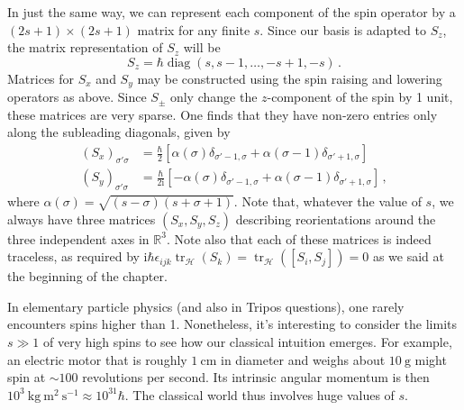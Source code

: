 \documentclass{article}
\theoremstyle{plain}\theoremheaderfont{\normalfont\itshape}\theorembodyfont{\rmfamily}\theoremseparator{.}\newtheorem*{rem}{Remark}\newtheorem*{ex}{Example}\newtheorem*{proof}{Proof}\newtheorem*{altp}{Alternative proof}
\theoremstyle{plain}\theoremheaderfont{\normalfont\bfseries}\theorembodyfont{\rmfamily}\theoremseparator{.}\newtheorem{thm}{Theorem}[section]\newtheorem{lem}[thm]{Lemma}\newtheorem{prop}[thm]{Proposition}\newtheorem*{cor}{Corollary}\newtheorem{defn}[thm]{Definition}\newtheorem{clm}[thm]{Claim}\newtheorem{clminproof}{Claim}
\theoremstyle{break}\theoremheaderfont{\normalfont\itshape}\theorembodyfont{\rmfamily}\theoremseparator{.\medskip}\newtheorem*{proofskip}{Proof}\newtheorem*{exs}{Examples}\newtheorem*{rems}{Remarks}
\theoremstyle{break}\theoremheaderfont{\normalfont\bfseries}\theorembodyfont{\rmfamily}\theoremseparator{.\medskip}\newtheorem{lemskip}[thm]{Lemma}\newtheorem{defnskip}[thm]{Definition}\newtheorem{propskip}[thm]{Proposition}\newtheorem{thmskip}[thm]{Theorem}
\numberwithin{equation}{section}
\newcommand{\unit}[1]{\ \mathrm{#1}}
\newcommand{\ii}{\mathrm{i}}
\newcommand{\hb}{\mathcal{H}}
\DeclareMathOperator{\tr}{tr}
\DeclareMathOperator{\diag}{diag}
\newcommand{\RR}{\mathbb{R}}
\begin{document}
    In just the same way, we can represent each component of the spin operator by a \((2s+1)\times (2s+1)\) matrix for any finite \(s\). Since our basis is adapted to \(S_z\), the matrix representation of \(S_z\) will be
    \begin{equation}
        S_z=\hbar\diag(s,s-1,\dots,-s+1,-s)\,.
    \end{equation}
    Matrices for \(S_x\) and \(S_y\) may be constructed using the spin raising and lowering operators as above. Since \(S_\pm\) only change the \(z\)-component of the spin by 1 unit, these matrices are very sparse. One finds that they have non-zero entries only along the subleading diagonals, given by
    \begin{equation}
        \begin{aligned}
            (S_x)_{\sigma'\sigma}&=\frac{\hbar}{2}[\alpha(\sigma)\delta_{\sigma'-1,\sigma}+\alpha(\sigma-1)\delta_{\sigma'+1,\sigma}]\\
            (S_y)_{\sigma'\sigma}&=\frac{\hbar}{2\ii}[-\alpha(\sigma)\delta_{\sigma'-1,\sigma}+\alpha(\sigma-1)\delta_{\sigma'+1,\sigma}]\,,
        \end{aligned}
    \end{equation}
    where \(\alpha(\sigma)=\sqrt{(s-\sigma)(s+\sigma+1)}\). Note that, whatever the value of \(s\), we always have three matrices \((S_x,S_y,S_z)\) describing reorientations around the three independent axes in \(\RR^3\). Note also that each of these matrices is indeed traceless, as required by \(\ii\hbar\epsilon_{ijk}\tr_\hb(S_k)=\tr_\hb([S_i, S_j])=0\) as we said at the beginning of the chapter.

    In elementary particle physics (and also in Tripos questions), one rarely encounters spins higher than 1. Nonetheless, it's interesting to consider the limits \(s\gg 1\) of very high spins to see how our classical intuition emerges. For example, an electric motor that is roughly \(1\unit{cm}\) in diameter and weighs about \(10\unit{g}\) might spin at \(\sim 100\) revolutions per second. Its intrinsic angular momentum is then \(10^3\unit{kg}\unit{m}^2\unit{s}^{-1}\approx 10^31\hbar\). The classical world thus involves huge values of \(s\).
\end{document}
